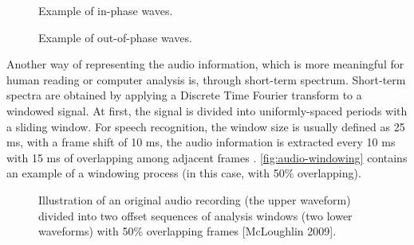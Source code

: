\begin{figure}[!ht]
        \noindent{}
        \caption{Example of in-phase waves.}
        \label{fig:in-phase-waves}
\end{figure}

\begin{figure}[!ht]
        \noindent{}
        \caption{Example of out-of-phase waves.}
        \label{fig:out-of-phase-waves}
\end{figure}

Another way of representing the audio information, which is more meaningful for human reading
or computer analysis is, through short-term spectrum. Short-term spectra are obtained by applying
a Discrete Time Fourier transform to a windowed signal. At first, the signal is divided
into uniformly-spaced periods with a sliding window. For speech recognition, the window size is usually defined as 25 ms, 
with a frame shift of 10 ms, the audio information is extracted every 10 ms with 15 ms of overlapping
among adjacent frames \cite{Huang2001}. \autoref{fig:audio-windowing} contains an example of a windowing process (in this case, 
with 50\% overlapping).

\begin{figure}[!ht]
        \noindent{}
        \caption{Illustration of an original audio recording (the upper waveform) divided into two
offset sequences of analysis windows (two lower waveforms) with 50\% overlapping frames [McLoughlin 2009].}
        \label{fig:audio-windowing}
\end{figure}

